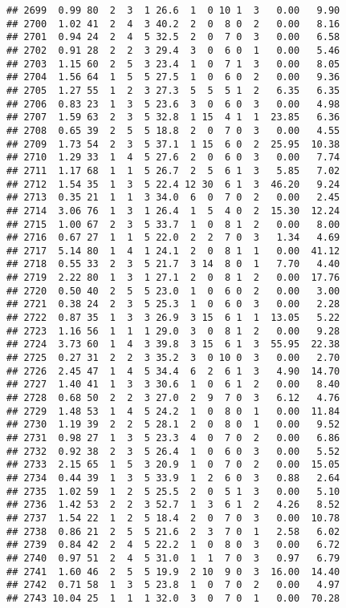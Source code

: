 \documentclass[
]{article}
\begin{document}
\begin{verbatim}
## 2699  0.99 80  2  3  1 26.6  1  0 10 1  3   0.00   9.90
## 2700  1.02 41  2  4  3 40.2  2  0  8 0  2   0.00   8.16
## 2701  0.94 24  2  4  5 32.5  2  0  7 0  3   0.00   6.58
## 2702  0.91 28  2  2  3 29.4  3  0  6 0  1   0.00   5.46
## 2703  1.15 60  2  5  3 23.4  1  0  7 1  3   0.00   8.05
## 2704  1.56 64  1  5  5 27.5  1  0  6 0  2   0.00   9.36
## 2705  1.27 55  1  2  3 27.3  5  5  5 1  2   6.35   6.35
## 2706  0.83 23  1  3  5 23.6  3  0  6 0  3   0.00   4.98
## 2707  1.59 63  2  3  5 32.8  1 15  4 1  1  23.85   6.36
## 2708  0.65 39  2  5  5 18.8  2  0  7 0  3   0.00   4.55
## 2709  1.73 54  2  3  5 37.1  1 15  6 0  2  25.95  10.38
## 2710  1.29 33  1  4  5 27.6  2  0  6 0  3   0.00   7.74
## 2711  1.17 68  1  1  5 26.7  2  5  6 1  3   5.85   7.02
## 2712  1.54 35  1  3  5 22.4 12 30  6 1  3  46.20   9.24
## 2713  0.35 21  1  1  3 34.0  6  0  7 0  2   0.00   2.45
## 2714  3.06 76  1  3  1 26.4  1  5  4 0  2  15.30  12.24
## 2715  1.00 67  2  3  5 33.7  1  0  8 1  2   0.00   8.00
## 2716  0.67 27  1  1  5 22.0  2  2  7 0  3   1.34   4.69
## 2717  5.14 80  1  4  1 24.1  2  0  8 1  1   0.00  41.12
## 2718  0.55 33  2  3  5 21.7  3 14  8 0  1   7.70   4.40
## 2719  2.22 80  1  3  1 27.1  2  0  8 1  2   0.00  17.76
## 2720  0.50 40  2  5  5 23.0  1  0  6 0  2   0.00   3.00
## 2721  0.38 24  2  3  5 25.3  1  0  6 0  3   0.00   2.28
## 2722  0.87 35  1  3  3 26.9  3 15  6 1  1  13.05   5.22
## 2723  1.16 56  1  1  1 29.0  3  0  8 1  2   0.00   9.28
## 2724  3.73 60  1  4  3 39.8  3 15  6 1  3  55.95  22.38
## 2725  0.27 31  2  2  3 35.2  3  0 10 0  3   0.00   2.70
## 2726  2.45 47  1  4  5 34.4  6  2  6 1  3   4.90  14.70
## 2727  1.40 41  1  3  3 30.6  1  0  6 1  2   0.00   8.40
## 2728  0.68 50  2  2  3 27.0  2  9  7 0  3   6.12   4.76
## 2729  1.48 53  1  4  5 24.2  1  0  8 0  1   0.00  11.84
## 2730  1.19 39  2  2  5 28.1  2  0  8 0  1   0.00   9.52
## 2731  0.98 27  1  3  5 23.3  4  0  7 0  2   0.00   6.86
## 2732  0.92 38  2  3  5 26.4  1  0  6 0  3   0.00   5.52
## 2733  2.15 65  1  5  3 20.9  1  0  7 0  2   0.00  15.05
## 2734  0.44 39  1  3  5 33.9  1  2  6 0  3   0.88   2.64
## 2735  1.02 59  1  2  5 25.5  2  0  5 1  3   0.00   5.10
## 2736  1.42 53  2  2  3 52.7  1  3  6 1  2   4.26   8.52
## 2737  1.54 22  1  2  5 18.4  2  0  7 0  3   0.00  10.78
## 2738  0.86 21  2  5  5 21.6  2  3  7 0  1   2.58   6.02
## 2739  0.84 42  2  4  5 22.2  1  0  8 0  3   0.00   6.72
## 2740  0.97 51  2  4  5 31.0  1  1  7 0  3   0.97   6.79
## 2741  1.60 46  2  5  5 19.9  2 10  9 0  3  16.00  14.40
## 2742  0.71 58  1  3  5 23.8  1  0  7 0  2   0.00   4.97
## 2743 10.04 25  1  1  1 32.0  3  0  7 0  1   0.00  70.28

\end{verbatim}
\end{document}

